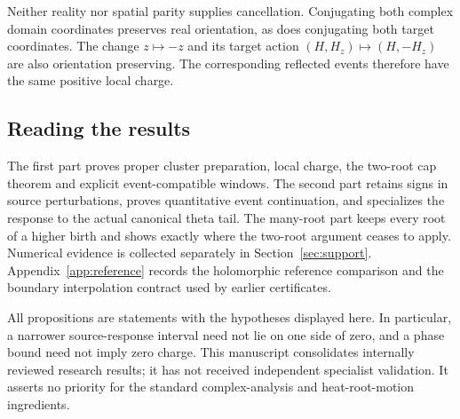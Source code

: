 Neither reality nor spatial parity supplies cancellation. Conjugating
both complex domain coordinates preserves real orientation, as does
conjugating both target coordinates. The change $z\mapsto-z$ and its
target action $(H,H_z)\mapsto(H,-H_z)$ are also orientation preserving.
The corresponding reflected events therefore have the same positive
local charge.

\subsection{Reading the results}

The first part proves proper cluster preparation, local charge, the
two-root cap theorem and explicit event-compatible windows. The second
part retains signs in source perturbations, proves quantitative event
continuation, and specializes the response to the actual canonical theta
tail. The many-root part keeps every root of a higher birth and shows
exactly where the two-root argument ceases to apply. Numerical evidence
is collected separately in Section~\ref{sec:support}. Appendix~\ref{app:reference}
records the holomorphic reference comparison and the boundary
interpolation contract used by earlier certificates.

All propositions are statements with the hypotheses displayed here.
In particular, a narrower source-response interval need not lie on one
side of zero, and a phase bound need not imply zero charge. This
manuscript consolidates internally reviewed research results; it has not
received independent specialist validation. It asserts no priority for
the standard complex-analysis and heat-root-motion ingredients.
